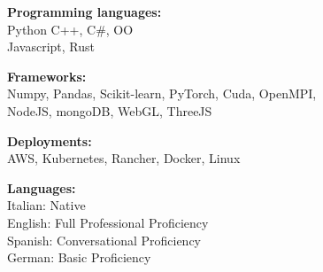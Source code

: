 \begin{minipage}[ht]{0.48\textwidth}
\textbf{Programming languages:} \\
Python C++, C\#, OO \\ Javascript, Rust
\vspace{1em}

\textbf{Frameworks:} \\
Numpy, Pandas, Scikit-learn, PyTorch, Cuda, OpenMPI, \\ 
NodeJS, mongoDB, WebGL, ThreeJS

\end{minipage}
\begin{minipage}[ht]{0.48\textwidth}
\textbf{Deployments:} \\
AWS, Kubernetes, Rancher, Docker, Linux

\vspace{1em}
\textbf{Languages:} \\
Italian: Native \\
English: Full Professional Proficiency\\
Spanish: Conversational Proficiency \\
German: Basic Proficiency

\end{minipage}



